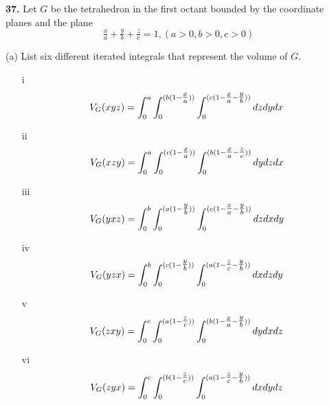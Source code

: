 \documentclass[11pt]{report}
\begin{document}
\textbf{37.} Let $G$ be the tetrahedron in the first octant bounded by the
coordinate planes and the plane \\

\[ \tfrac{x}{a} + \tfrac{y}{b} + \tfrac{z}{c} = 1, (a > 0, b > 0, c > 0) \]

(a) List six different iterated integrals that represent the volume of $G$. \\
\begin{itemize}
	\item[i] \[V_G(xyz)=\int_0^{a}\int_0^{(b(1-\tfrac{x}{a}))}\int_0^{(c(1-\tfrac{x}{a}-\tfrac{y}{b}))}dzdydx\]
	\item[ii] \[V_G(xzy)=\int_0^{a}\int_0^{(c(1-\tfrac{x}{a}))}\int_0^{(b(1-\tfrac{x}{a}-\tfrac{z}{c}))}dydzdx\]
	\item[iii] \[V_G(yxz)=\int_0^{b}\int_0^{(a(1-\tfrac{y}{b}))}\int_0^{(c(1-\tfrac{x}{a}-\tfrac{y}{b}))}dzdxdy\]
	\item[iv] \[V_G(yzx)=\int_0^{b}\int_0^{(c(1-\tfrac{y}{b}))}\int_0^{(a(1-\tfrac{z}{c}-\tfrac{y}{b}))}dxdzdy\]
	\item[v] \[V_G(zxy)=\int_0^{c}\int_0^{(a(1-\tfrac{z}{c}))}\int_0^{(b(1-\tfrac{x}{a}-\tfrac{y}{b}))}dydxdz\]
	\item[vi] \[V_G(zyx)=\int_0^{c}\int_0^{(b(1-\tfrac{z}{c}))}\int_0^{(a(1-\tfrac{z}{c}-\tfrac{y}{b}))}dxdydz\]
\end{itemize}
\end{document}
